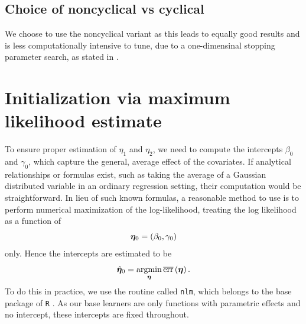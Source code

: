 \subsection{Choice of noncyclical vs cyclical}
We choose to use the noncyclical variant as this leads to equally good results and is less computationally intensive to tune, due to a one-dimensinal stopping parameter search, as stated in \citet{schmid}.

\section{Initialization via maximum likelihood estimate}
To ensure proper estimation of $\eta_1$ and $\eta_2$, we need to compute the intercepts $\beta_{0}$ and $\gamma_{0}$, which capture the general, average effect of the covariates.
If analytical relationships or formulas exist, such as taking the average of a Gaussian distributed variable in an ordinary regression setting, their computation would be straightforward.
In lieu of such known formulas, a reasonable method to use is to perform numerical maximization of the log-likelihood, treating the log likelihood as a function of
\begin{equation*}
    \boldsymbol{\eta}_0=\left(\beta_{0},\gamma_{0}\right)
\end{equation*}
only.
Hence the intercepts are estimated to be
\begin{equation*}
    \hat{\boldsymbol{\eta}}_0=\operatorname*{argmin}_{\boldsymbol{\eta}}\overline{\text{err}}\left(\boldsymbol{\eta}\right).
\end{equation*}
To do this in practice, we use the routine called \verb|nlm|, which belongs to the base package of \verb|R| \citep{Rlang}.
As our base learners are only functions with parametric effects and no intercept, these intercepts are fixed throughout.

